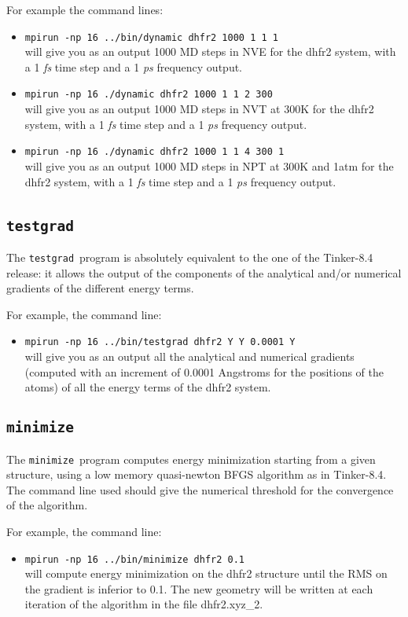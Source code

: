 \documentclass[peerreview]{IEEEtran}
\def\minimize{\texttt{minimize}}
\def\testgrad{\texttt{testgrad}}
\def\mpirun{\texttt{mpirun -np}}
\begin{document}
For example the command lines:
\begin{itemize}
    \item[] \mpirun\texttt{  16 ../bin/dynamic dhfr2 1000 1 1 1} \\
    will give you as an output 1000 MD steps in NVE for the dhfr2 system, with a 1  {\em fs} time step and a 1 {\em ps} frequency output.
    \item[] \mpirun\texttt{  16 ./dynamic dhfr2 1000 1 1 2 300} \\
    will give you as an output 1000 MD steps in NVT at 300K for the dhfr2 system, with a 1  {\em fs} time step and a 1  {\em ps} frequency output.
    \item[] \mpirun\texttt{  16 ./dynamic dhfr2 1000 1 1 4 300 1} \\
    will give you as an output 1000 MD steps in NPT at 300K and 1atm for the dhfr2 system, with a 1  {\em fs} time step and a 1  {\em ps} frequency output.
\end{itemize}
\subsection{\testgrad\ }
The \testgrad\ program is absolutely equivalent to the one of the Tinker-8.4 release: it allows the output of the components of the analytical and/or numerical gradients of the different energy terms.

For example, the command line:
\begin{itemize}
\item []\mpirun\texttt{  16 ../bin/testgrad dhfr2 Y Y 0.0001 Y} \\
will give you as an output all the analytical and numerical gradients (computed with an increment of 0.0001 Angstroms for the positions of the atoms) of all the energy terms of the dhfr2 system.
\end{itemize}
\subsection{\minimize}
The \minimize\ program computes energy minimization starting from a given structure, using a low memory quasi-newton BFGS algorithm as in Tinker-8.4. The command line used should give the numerical threshold for the convergence of the algorithm.

For example, the command line:
\begin{itemize}
\item []\mpirun\texttt{  16 ../bin/minimize dhfr2 0.1} \\
will compute energy minimization on the dhfr2 structure until the RMS on the gradient is inferior to 0.1. The new geometry will be written at each iteration of the algorithm in the file dhfr2.xyz\_2.
\end{itemize}
\end{document}
